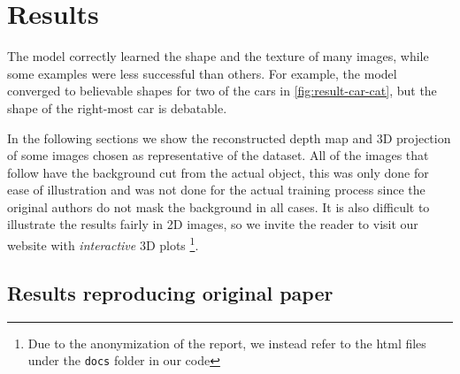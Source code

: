 \section{Results}
\label{sec:results}
The model correctly learned the shape and the texture of many images, while some examples were less successful than others. For example, the model converged to believable shapes for two of the cars in \autoref{fig:result-car-cat}, but the shape of the right-most car is debatable. 

In the following sections we show the reconstructed depth map and 3D projection of some images chosen as representative of the dataset. All of the images that follow have the background cut from the actual object, this was only done for ease of illustration and was not done for the actual training process since the original authors do not mask the background in all cases. It is also difficult to illustrate the results fairly in 2D images, so we invite the reader to visit our website %
with \textit{interactive} 3D plots
\footnote{Due to the anonymization of the report, we instead refer to the html files under the \lstinline{docs} folder in our code}.

\subsection{Results reproducing original paper}
\label{sec:replication}


